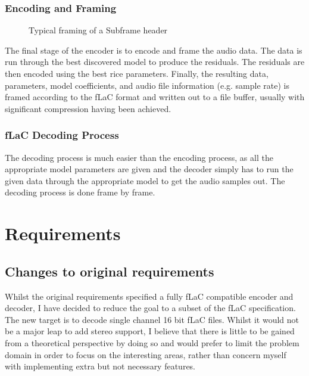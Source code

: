 \documentclass[12pt]{scrartcl}
\begin{document}
  \subsubsection*{Encoding and Framing} 
    \begin{figure}[H]
    \caption{Typical framing of a Subframe header}
    \label{fig:subframe_header}
  \end{figure}
  The final stage of the encoder is to encode and frame the audio data. The data is run through the best discovered model to produce the residuals. The residuals are then encoded using the best rice parameters. Finally, the resulting data, parameters, model coefficients, and audio file information (e.g. sample rate) is framed according to the fLaC format and written out to a file buffer, usually with significant compression having been achieved.
  
  \subsubsection{fLaC Decoding Process}
  The decoding process is much easier than the encoding process, as all the appropriate model parameters are given and the decoder simply has to run the given data through the appropriate model to get the audio samples out. The decoding process is done frame by frame.
  
  
  
  \section{Requirements}
  \subsection{Changes to original requirements}
  Whilst the original requirements specified a fully fLaC compatible encoder and decoder, I have decided to reduce the goal to a subset of the fLaC specification. The new target is to decode single channel 16 bit fLaC files. Whilst it would not be a major leap to add stereo support, I believe that there is little to be gained from a theoretical perspective by doing so and would prefer to limit the problem domain in order to focus on the interesting areas, rather than concern myself with implementing extra but not necessary features. 
  
\end{document}
